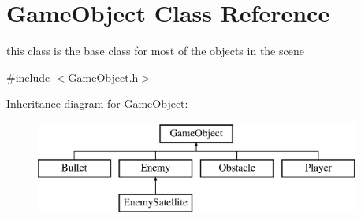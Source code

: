 \hypertarget{classGameObject}{}\section{Game\+Object Class Reference}
\label{classGameObject}


this class is the base class for most of the objects in the scene  




{\ttfamily \#include $<$Game\+Object.\+h$>$}

Inheritance diagram for Game\+Object\+:\begin{figure}[H]
\begin{center}
\leavevmode
\includegraphics[height=3.000000cm]{classGameObject}
\end{center}
\end{figure}
